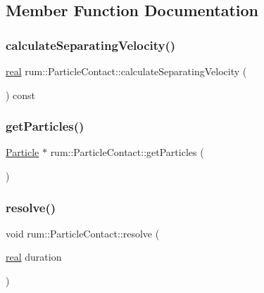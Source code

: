 \subsection{Member Function Documentation}
\mbox{\label{classrum_1_1_particle_contact_a85e06dde6b23622bf8d9f6a99205fcfc}} 
\subsubsection{\texorpdfstring{calculate\+Separating\+Velocity()}{calculateSeparatingVelocity()}}
{\footnotesize\ttfamily \mbox{\hyperlink{namespacerum_a7e8cca23573d5eaead0f138cbaa4862c}{real}} rum\+::\+Particle\+Contact\+::calculate\+Separating\+Velocity (\begin{DoxyParamCaption}{ }\end{DoxyParamCaption}) const}

\mbox{\label{classrum_1_1_particle_contact_a3cccc345ae55939b5fca963e86d7deae}} 
\subsubsection{\texorpdfstring{get\+Particles()}{getParticles()}}
{\footnotesize\ttfamily \mbox{\hyperlink{classrum_1_1_particle}{Particle}} $\ast$ rum\+::\+Particle\+Contact\+::get\+Particles (\begin{DoxyParamCaption}{ }\end{DoxyParamCaption})}

\mbox{\label{classrum_1_1_particle_contact_acf090d7537e78bea0e9008b55a3959c9}} 
\subsubsection{\texorpdfstring{resolve()}{resolve()}}
{\footnotesize\ttfamily void rum\+::\+Particle\+Contact\+::resolve (\begin{DoxyParamCaption}\item[{\mbox{\hyperlink{namespacerum_a7e8cca23573d5eaead0f138cbaa4862c}{real}}}]{duration }\end{DoxyParamCaption})}

